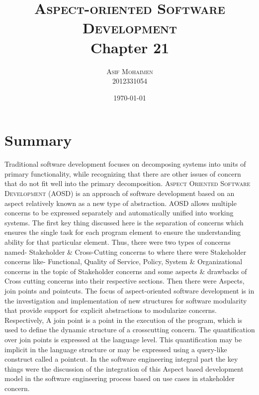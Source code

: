 \documentclass[dvips,12pt]{article}
\begin{document}
\title{
  \textsc{Aspect-oriented Software Development}\\
  Chapter 21
}
\author{
  \textsc{Asif Mohaimen}\\
  2012331054\\
}
\date{\today}

\maketitle


\section{Summary}
Traditional software development focuses on decomposing systems into units of primary functionality, while recognizing that there are other issues of concern that do not fit well into the primary decomposition. \textsc{Aspect Oriented Software Development} (AOSD) is an approach of software development based on an aspect relatively known as a new type of abstraction. AOSD allows multiple concerns to be expressed separately and automatically unified into working systems. The first key thing discussed here is the separation of concerns which ensures the single task for each program element to ensure the understanding ability for that particular element. Thus, there were two types of concerns named- Stakeholder \& Cross-Cutting concerns to where there were Stakeholder concerns like- Functional, Quality of Service, Policy, System \& Organizational concerns in the topic of Stakeholder concerns and some aspects \& drawbacks of Cross cutting concerns into their respective sections. Then there were Aspects, join points and pointcuts. The focus of aspect-oriented software development is in the investigation and implementation of new structures for software modularity that provide support for explicit abstractions to modularize concerns. Respectively, A join point is a point in the execution of the program, which is used to define the dynamic structure of a crosscutting concern. The quantification over join points is expressed at the language level. This quantification may be implicit in the language structure or may be expressed using a query-like construct called a pointcut. In the software engineering integral part the key things were the discussion of the integration of this Aspect based development model in the software engineering process based on use cases in stakeholder concern. 
\end{document}
